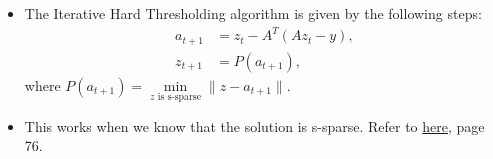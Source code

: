 \documentclass[11pt,reqno]{amsart}
\theoremstyle{remark}
\begin{document}
\begin{sloppypar}
\begin{itemize}
\begin{enumerate}
\begin{proof}
\begin{align*}
\end{align*}
We use the lemma to arrive $\leq\dfrac{\delta_{2s}}{1-\delta_{2s}}\lVert\alpha_{S_0}\rVert\sum\limits_{2k\geq 1}\lVert \alpha_{S_k}\rVert_2$.
Further, the construction of $\alpha$ yields $\leq \dfrac{\delta_{2S}}{1-\delta_{2S}}\lVert\alpha_{S_0}\rVert_2\sum\limits_{k\geq 1}\dfrac{\lVert\alpha_{S_{k-1}}\rVert}{\sqrt{s}}$.
\end{proof}
\end{enumerate}
\item The Iterative Hard Thresholding algorithm is given by the following steps:
\begin{align}
    a_{t+1} &= z_t - A^T(Az_t - y), \\
    z_{t+1} &= P(a_{t+1}),
\end{align}
where $P(a_{t+1})=\min\limits_{z\text{ is s-sparse}}\lVert z-a_{t+1}\rVert$.
\item This works when we know that the solution is s-sparse. Refer to \href{https://users.math.msu.edu/users/iwenmark/Teaching/MTH994/Holger_Simon_book.pdf}{here}, page 76.
\end{itemize}
\end{sloppypar}
\end{document}
